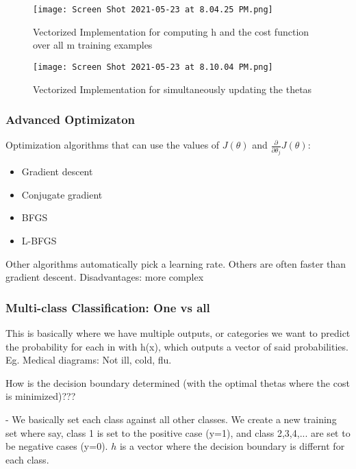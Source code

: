 \documentclass{article}
\begin{document}
\begin{figure}[h]
    \centering
    \texttt{[image: Screen Shot 2021-05-23 at 8.04.25 PM.png]}
    \caption{Vectorized Implementation for computing h and the cost function over all m training examples}
    \label{fig:my_label}
\end{figure}


\begin{figure}[h]
    \centering
    \texttt{[image: Screen Shot 2021-05-23 at 8.10.04 PM.png]}
    \caption{Vectorized Implementation for simultaneously updating the thetas}
    \label{fig:my_label}
\end{figure}




\subsubsection{Advanced Optimizaton}

Optimization algorithms that can use the values of $J(\theta)$ and $\frac{\partial}{\partial \theta_j} J(\theta)$:
\begin{itemize}
    \item Gradient descent
    \item Conjugate gradient
    \item BFGS
    \item L-BFGS
\end{itemize}

Other algorithms automatically pick a learning rate. Others are often faster than gradient descent. Disadvantages: more complex




\subsubsection{Multi-class Classification: One vs all}


This is basically where we have multiple outputs, or categories we want to predict the probability for each in with h(x), which outputs a vector of said probabilities. Eg. Medical diagrams: Not ill, cold, flu.


How is the decision boundary determined (with the optimal thetas where the cost is minimized)???

- We basically set each class against all other classes. We create a new training set where say, class 1 is set to the positive case (y=1), and class 2,3,4,... are set to be negative cases (y=0). $h$ is a vector where the decision boundary is differnt for each class.
\end{document}
